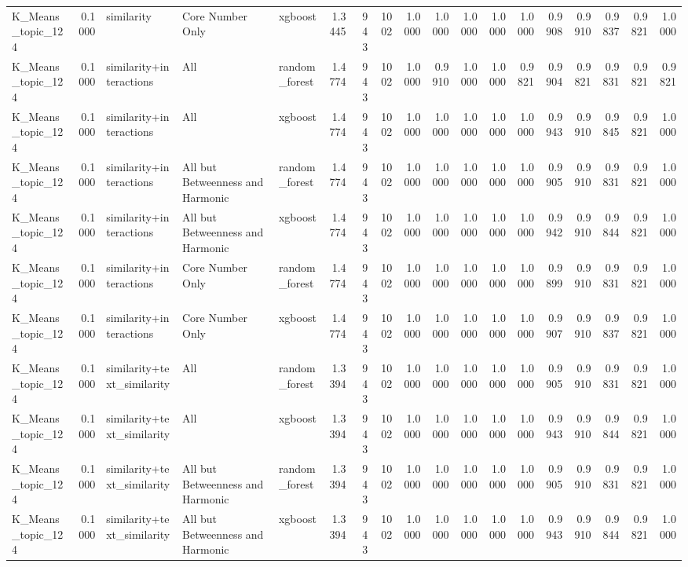 \begin{tabular}{lrlllrrrrrrrrrrrrr}
K_Means_topic_124 & 0.1000 & similarity & Core Number Only & xgboost & 1.3445 & 943 & 1002 & 1.0000 & 1.0000 & 1.0000 & 1.0000 & 1.0000 & 0.9908 & 0.9910 & 0.9837 & 0.9821 & 1.0000 \\
K_Means_topic_124 & 0.1000 & similarity+interactions & All & random_forest & 1.4774 & 943 & 1002 & 1.0000 & 0.9910 & 1.0000 & 1.0000 & 0.9821 & 0.9904 & 0.9821 & 0.9831 & 0.9821 & 0.9821 \\
K_Means_topic_124 & 0.1000 & similarity+interactions & All & xgboost & 1.4774 & 943 & 1002 & 1.0000 & 1.0000 & 1.0000 & 1.0000 & 1.0000 & 0.9943 & 0.9910 & 0.9845 & 0.9821 & 1.0000 \\
K_Means_topic_124 & 0.1000 & similarity+interactions & All but Betweenness and Harmonic & random_forest & 1.4774 & 943 & 1002 & 1.0000 & 1.0000 & 1.0000 & 1.0000 & 1.0000 & 0.9905 & 0.9910 & 0.9831 & 0.9821 & 1.0000 \\
K_Means_topic_124 & 0.1000 & similarity+interactions & All but Betweenness and Harmonic & xgboost & 1.4774 & 943 & 1002 & 1.0000 & 1.0000 & 1.0000 & 1.0000 & 1.0000 & 0.9942 & 0.9910 & 0.9844 & 0.9821 & 1.0000 \\
K_Means_topic_124 & 0.1000 & similarity+interactions & Core Number Only & random_forest & 1.4774 & 943 & 1002 & 1.0000 & 1.0000 & 1.0000 & 1.0000 & 1.0000 & 0.9899 & 0.9910 & 0.9831 & 0.9821 & 1.0000 \\
K_Means_topic_124 & 0.1000 & similarity+interactions & Core Number Only & xgboost & 1.4774 & 943 & 1002 & 1.0000 & 1.0000 & 1.0000 & 1.0000 & 1.0000 & 0.9907 & 0.9910 & 0.9837 & 0.9821 & 1.0000 \\
K_Means_topic_124 & 0.1000 & similarity+text_similarity & All & random_forest & 1.3394 & 943 & 1002 & 1.0000 & 1.0000 & 1.0000 & 1.0000 & 1.0000 & 0.9905 & 0.9910 & 0.9831 & 0.9821 & 1.0000 \\
K_Means_topic_124 & 0.1000 & similarity+text_similarity & All & xgboost & 1.3394 & 943 & 1002 & 1.0000 & 1.0000 & 1.0000 & 1.0000 & 1.0000 & 0.9943 & 0.9910 & 0.9844 & 0.9821 & 1.0000 \\
K_Means_topic_124 & 0.1000 & similarity+text_similarity & All but Betweenness and Harmonic & random_forest & 1.3394 & 943 & 1002 & 1.0000 & 1.0000 & 1.0000 & 1.0000 & 1.0000 & 0.9905 & 0.9910 & 0.9831 & 0.9821 & 1.0000 \\
K_Means_topic_124 & 0.1000 & similarity+text_similarity & All but Betweenness and Harmonic & xgboost & 1.3394 & 943 & 1002 & 1.0000 & 1.0000 & 1.0000 & 1.0000 & 1.0000 & 0.9943 & 0.9910 & 0.9844 & 0.9821 & 1.0000 \\

\end{tabular}
